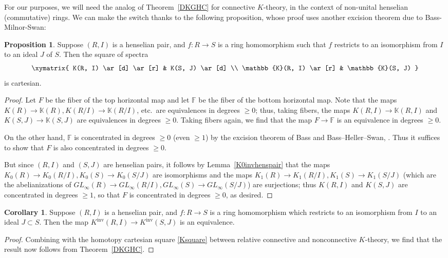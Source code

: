 \documentclass{amsart}
\newcommand{\knf}{K^{\mathrm{inv}}}
\theoremstyle{definition}
\newtheorem{proposition}[definition]{Proposition}
\newtheorem{corollary}[definition]{Corollary}
\begin{document}
For our purposes, 
we will need the analog of Theorem~\ref{DKGHC} for connective $K$-theory, in
the context of non-unital henselian (commutative) rings.   We can make the
switch thanks to the following proposition, whose proof uses another excision
theorem due to Bass-Milnor-Swan:

\begin{proposition} 
Suppose $(R,I)$ is a henselian pair, and $f:R\rightarrow S$ is a ring homomorphism such that $f$ restricts to an isomorphism from $I$ to an ideal $J$ of $S$.  Then the square of spectra
\begin{equation} \label{Ksquare} \xymatrix{
K(R, I) \ar[d]  \ar[r] &  K(S, J) \ar[d]  \\
\mathbb{K}(R, I) \ar[r] &  \mathbb{K}(S, J)
}\end{equation}
is cartesian. 
\end{proposition} 
\begin{proof} 
Let $F$ be the fiber of the top horizontal map and let $\mathbb{F}$ be the fiber
of the bottom horizontal map. Note that the maps $K(R) \to \mathbb{K}(R), K(R/I)
\to \mathbb{K}(R/I)$, etc.\ are equivalences in degrees $ \geq 0$; thus, taking
fibers, the maps $K(R, I) \to \mathbb{K}(R, I)$ and $K(S, J) \to \mathbb{K}(S,
J)$ are equivalences in degrees $\geq 0$. Taking fibers again, we find that the
map $F \to \mathbb{F}$ is an equivalence in degrees $\geq 0$.

On the other hand, $\mathbb{F}$ is concentrated in degrees $\geq 0$ (even
$\geq 1$) by the
excision theorem of Bass and Bass--Heller--Swan, \cite[Thm.~XII.8.3]{Bass}.  Thus it suffices to show that $F$ is also concentrated in degrees $\geq 0$.

But since $(R, I)$ and $(S, J)$ are henselian pairs, it follows by
Lemma~\ref{K0invhenspair} that the maps
$K_0(R) \to K_0(R/I), K_0(S) \to K_0(S/J)$ are isomorphisms and the maps
$K_1(R) \to K_1(R/I), K_1(S) \to K_1(S/J)$ (which are the abelianizations of
$GL_\infty(R) \to GL_\infty(R/I), GL_\infty(S) \to GL_\infty(S/J)$)  are surjections; thus $K(R, I)$ and
$K(S, J)$ are concentrated in degrees $\geq 1$, so that $F$ is concentrated in
degrees $\geq 0$, as desired.
\end{proof} 


\begin{corollary} 
\label{replaceexcision}
Suppose $(R,I)$ is a henselian pair, and $f:R\rightarrow S$ is a ring homomorphism which restricts to an isomorphism from $I$ to an ideal $J\subset S$. Then the map $\knf(R, I) \to \knf(S, J)$ is  an equivalence. 
\end{corollary} 
\begin{proof} 
Combining with the homotopy cartesian square \eqref{Ksquare} between relative
connective and nonconnective $K$-theory, we find that the result now follows from
Theorem~\ref{DKGHC}.  
\end{proof} 
\end{document}
